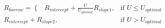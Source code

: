 \documentclass[preview]{standalone}
\begin{document}
\begin{align*}
R _{borrow} = \begin{cases}  \end{cases}  R _{intercept} + \frac{U}{U_{optimal}} R _{slope1}, & \text{if } U \leq U_{optimal} \\  R _{intercept} +  R _{slope2}, & \text{if } U > U_{optimal}
\end{align*}
\end{document}
